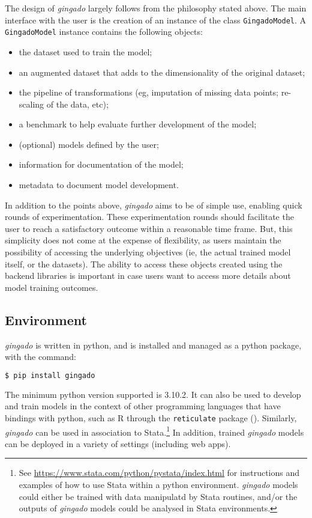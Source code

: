 \documentclass{article}
\begin{document}
The design of \textit{gingado} largely follows from the philosophy stated above. The main interface with the user is the creation of an instance of the class \texttt{GingadoModel}. A \texttt{GingadoModel} instance contains the following objects:

\begin{itemize}
    \item the dataset used to train the model;
    \item an augmented dataset that adds to the dimensionality of the original dataset;
    \item the pipeline of transformations (eg, imputation of missing data points; re-scaling of the data, etc);
    \item a benchmark to help evaluate further development of the model;
    \item (optional) models defined by the user;
    \item information for documentation of the model;
    \item metadata to document model development.
\end{itemize}

In addition to the points above, \textit{gingado} aims to be of simple use, enabling quick rounds of experimentation. These experimentation rounds should facilitate the user to reach a satisfactory outcome within a reasonable time frame. But, this simplicity does not come at the expense of flexibility, as users maintain the possibility of accessing the underlying objectives (ie, the actual trained model itself, or the datasets). The ability to access these objects created using the backend libraries is important in case users want to access more details about model training outcomes.


\subsection{Environment}

\textit{gingado} is written in python, and is installed and managed as a python package, with the command:
\begin{lstlisting}[language=bash, caption = Installing \textit{gingado}, frame=single]
$ pip install gingado
\end{lstlisting}

The minimum python version supported is 3.10.2. It can also be used to develop and train models in the context of other programming languages that have bindings with python, such as R through the \texttt{reticulate} package (\cite{reticulate}). Similarly, \textit{gingado} can be used in association to Stata.\footnote{See \url{https://www.stata.com/python/pystata/index.html} for instructions and examples of how to use Stata within a python environment. \textit{gingado} models could either be trained with data manipulatd by Stata routines, and/or the outputs of \textit{gingado} models could be analysed in Stata environments.} In addition, trained \textit{gingado} models can be deployed in a variety of settings (including web apps).
\end{document}
